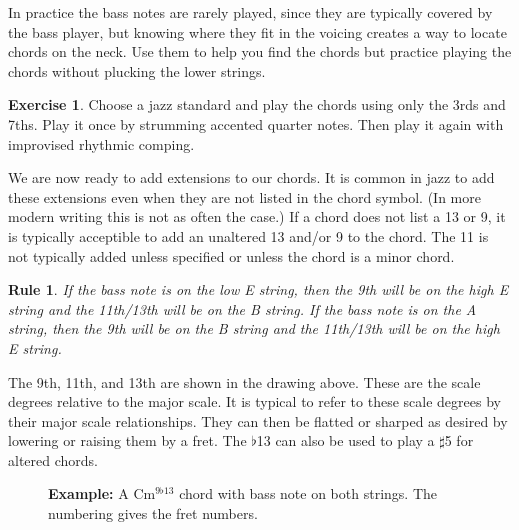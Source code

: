 \documentclass[12pt]{article}
\newtheorem{nrule}{Rule}
\theoremstyle{definition}
\newtheorem{exercise}{Exercise}
\begin{document}
In practice the bass notes are rarely played, since they are typically covered by the bass player, but knowing where they fit in the voicing creates a way to locate chords on the neck. Use them to help you find the chords but practice playing the chords without plucking the lower strings. 

\begin{exercise} \label{ex:chunking}
Choose a jazz standard and play the chords using only the 3rds and 7ths. 
Play it once by strumming accented quarter notes. Then play it again with improvised rhythmic comping. 
\end{exercise}

We are now ready to add extensions to our chords. It is common in jazz to add these extensions even when they are not listed in the chord symbol. (In more modern writing this is not as often the case.) If a chord does not list a 13 or 9, it is typically acceptible to add an unaltered 13 and/or 9 to the chord. The 11 is not typically added unless specified or unless the chord is a minor chord. 

\begin{nrule}
If the bass note is on the low E string, then the 9th will be on the high E string and the 11th/13th will be on the B string. If the bass note is on the A string, then the 9th will be on the B string and the 11th/13th will be on the high E string. 
\end{nrule}

\noindent
\begin{minipage}{0.5\textwidth}
\end{minipage}
\begin{minipage}{0.5\textwidth}
\end{minipage}

The 9th, 11th, and 13th are shown in the drawing above. These are the scale degrees relative to the major scale. It is typical to refer to these scale degrees by their major scale relationships. They can then be flatted or sharped as desired by lowering or raising them by a fret. The $\flat$13 can also be used to play a $\sharp$5 for altered chords. 

\begin{figure}[H]
\noindent
\textbf{Example:} A Cm$^{9 \flat 13}$ chord with bass note on both strings. The numbering gives the fret numbers. 

\noindent
\begin{minipage}{0.5\textwidth}
\end{minipage}
\begin{minipage}{0.5\textwidth}
\end{minipage}
\end{figure}
\end{document}
